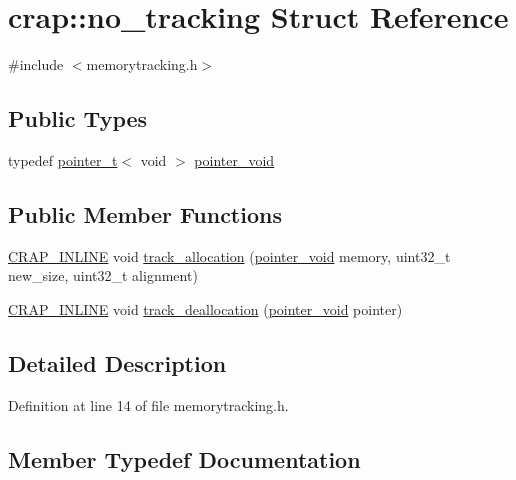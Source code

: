 \hypertarget{structcrap_1_1no__tracking}{}\section{crap\+:\+:no\+\_\+tracking Struct Reference}
\label{structcrap_1_1no__tracking}


{\ttfamily \#include $<$memorytracking.\+h$>$}

\subsection*{Public Types}
\begin{DoxyCompactItemize}
\item 
typedef \hyperlink{structcrap_1_1pointer__t}{pointer\+\_\+t}$<$ void $>$ \hyperlink{structcrap_1_1no__tracking_af73abf0cb41ffe7aa60e37885885f328}{pointer\+\_\+void}
\end{DoxyCompactItemize}
\subsection*{Public Member Functions}
\begin{DoxyCompactItemize}
\item 
\hyperlink{config__x86_8h_a5a40526b8d842e7ff731509998bb0f1c}{C\+R\+A\+P\+\_\+\+I\+N\+L\+I\+N\+E} void \hyperlink{structcrap_1_1no__tracking_a76ca19312927808d11d005393104eb21}{track\+\_\+allocation} (\hyperlink{structcrap_1_1no__tracking_af73abf0cb41ffe7aa60e37885885f328}{pointer\+\_\+void} memory, uint32\+\_\+t new\+\_\+size, uint32\+\_\+t alignment)
\item 
\hyperlink{config__x86_8h_a5a40526b8d842e7ff731509998bb0f1c}{C\+R\+A\+P\+\_\+\+I\+N\+L\+I\+N\+E} void \hyperlink{structcrap_1_1no__tracking_ad4d2f6bab0cccaf679eae273f5f77530}{track\+\_\+deallocation} (\hyperlink{structcrap_1_1no__tracking_af73abf0cb41ffe7aa60e37885885f328}{pointer\+\_\+void} pointer)
\end{DoxyCompactItemize}


\subsection{Detailed Description}


Definition at line 14 of file memorytracking.\+h.



\subsection{Member Typedef Documentation}
\hypertarget{structcrap_1_1no__tracking_af73abf0cb41ffe7aa60e37885885f328}{}
